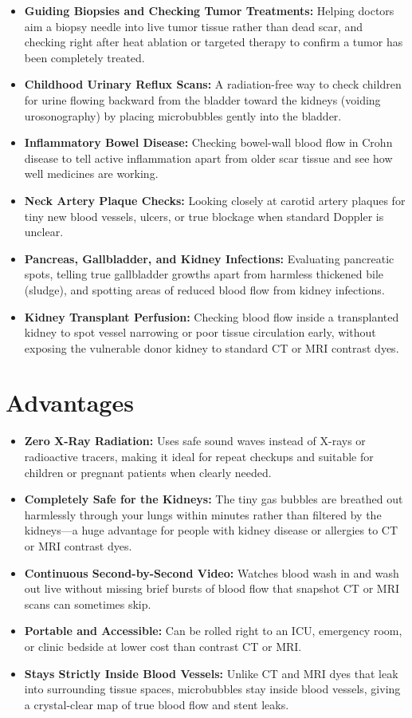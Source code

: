 \begin{itemize}
    \item \textbf{Guiding Biopsies and Checking Tumor Treatments:} Helping doctors aim a biopsy needle into live tumor tissue rather than dead scar, and checking right after heat ablation or targeted therapy to confirm a tumor has been completely treated.
    \item \textbf{Childhood Urinary Reflux Scans:} A radiation-free way to check children for urine flowing backward from the bladder toward the kidneys (voiding urosonography) by placing microbubbles gently into the bladder.
    \item \textbf{Inflammatory Bowel Disease:} Checking bowel-wall blood flow in Crohn disease to tell active inflammation apart from older scar tissue and see how well medicines are working.
    \item \textbf{Neck Artery Plaque Checks:} Looking closely at carotid artery plaques for tiny new blood vessels, ulcers, or true blockage when standard Doppler is unclear.
    \item \textbf{Pancreas, Gallbladder, and Kidney Infections:} Evaluating pancreatic spots, telling true gallbladder growths apart from harmless thickened bile (sludge), and spotting areas of reduced blood flow from kidney infections.
    \item \textbf{Kidney Transplant Perfusion:} Checking blood flow inside a transplanted kidney to spot vessel narrowing or poor tissue circulation early, without exposing the vulnerable donor kidney to standard CT or MRI contrast dyes.
\end{itemize}

\section{Advantages}

\begin{itemize}
    \item \textbf{Zero X-Ray Radiation:} Uses safe sound waves instead of X-rays or radioactive tracers, making it ideal for repeat checkups and suitable for children or pregnant patients when clearly needed.
    \item \textbf{Completely Safe for the Kidneys:} The tiny gas bubbles are breathed out harmlessly through your lungs within minutes rather than filtered by the kidneys---a huge advantage for people with kidney disease or allergies to CT or MRI contrast dyes.
    \item \textbf{Continuous Second-by-Second Video:} Watches blood wash in and wash out live without missing brief bursts of blood flow that snapshot CT or MRI scans can sometimes skip.
    \item \textbf{Portable and Accessible:} Can be rolled right to an ICU, emergency room, or clinic bedside at lower cost than contrast CT or MRI.
    \item \textbf{Stays Strictly Inside Blood Vessels:} Unlike CT and MRI dyes that leak into surrounding tissue spaces, microbubbles stay inside blood vessels, giving a crystal-clear map of true blood flow and stent leaks.
\end{itemize}

